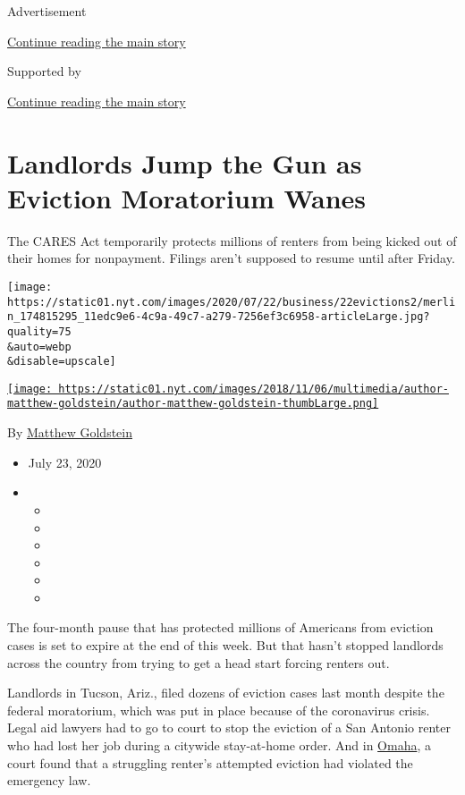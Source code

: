 Advertisement

\protect\hyperlink{after-top}{Continue reading the main story}

Supported by

\protect\hyperlink{after-sponsor}{Continue reading the main story}

\hypertarget{landlords-jump-the-gun-as-eviction-moratorium-wanes}{%
\section{Landlords Jump the Gun as Eviction Moratorium
Wanes}\label{landlords-jump-the-gun-as-eviction-moratorium-wanes}}

The CARES Act temporarily protects millions of renters from being kicked
out of their homes for nonpayment. Filings aren't supposed to resume
until after Friday.

\texttt{[image: https://static01.nyt.com/images/2020/07/22/business/22evictions2/merlin\_174815295\_11edc9e6-4c9a-49c7-a279-7256ef3c6958-articleLarge.jpg?quality=75\\\&auto=webp\\\&disable=upscale]}

\href{https://www.nytimes.com/by/matthew-goldstein}{\texttt{[image: https://static01.nyt.com/images/2018/11/06/multimedia/author-matthew-goldstein/author-matthew-goldstein-thumbLarge.png]}}

By \href{https://www.nytimes.com/by/matthew-goldstein}{Matthew
Goldstein}

\begin{itemize}
\item
  July 23, 2020
\item
  \begin{itemize}
  \item
  \item
  \item
  \item
  \item
  \item
  \end{itemize}
\end{itemize}

The four-month pause that has protected millions of Americans from
eviction cases is set to expire at the end of this week. But that hasn't
stopped landlords across the country from trying to get a head start
forcing renters out.

Landlords in Tucson, Ariz., filed dozens of eviction cases last month
despite the federal moratorium, which was put in place because of the
coronavirus crisis. Legal aid lawyers had to go to court to stop the
eviction of a San Antonio renter who had lost her job during a citywide
stay-at-home order. And in
\href{https://www.nhlp.org/wp-content/uploads/Douglas-County-Order-of-Dismissal.pdf}{Omaha},
a court found that a struggling renter's attempted eviction had violated
the emergency law.

